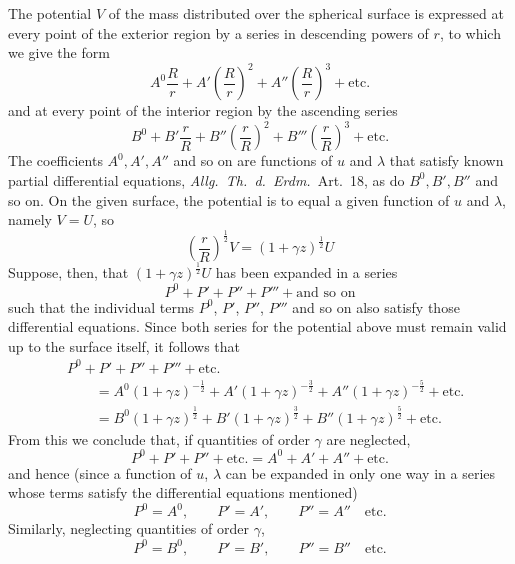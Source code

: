 The potential $V$ of the mass distributed over the spherical surface is expressed at every point of the exterior region by a series in descending powers of $r$, to which we give the form
\[
A^0\frac Rr+A'\left(\frac Rr\right)^2+A''\left(\frac Rr\right)^3+\text{etc.}
\]
and at every point of the interior region by the ascending series
\[
B^0+B'\frac rR+B''\left(\frac rR\right)^2+B'''\left(\frac rR\right)^3+\text{etc.}
\]
The coefficients $A^0,A',A''$ and so on are functions of $u$ and $\lambda$ that satisfy known partial differential equations, \textit{Allg.\ Th.\ d.\ Erdm.}\ Art.\ 18, as do $B^0,B',B''$ and so on. On the given surface, the potential is to equal a given function of $u$ and $\lambda$, namely $V=U$, so
\[
\left(\frac rR\right)^{\frac12}V=(1+\gamma z)^{\frac12}U
\]
Suppose, then, that $(1+\gamma z)^{\frac12}U$ has been expanded in a series
\[
P^0+P'+P''+P'''+\text{and so on}
\]
such that the individual terms $P^0$, $P'$, $P''$, $P'''$ and so on also satisfy those differential equations. Since both series for the potential above must remain valid up to the surface itself, it follows that
\[
\begin{aligned}
&P^0+P'+P''+P'''+\text{etc.}\\
&\qquad=A^0(1+\gamma z)^{-\frac12}+A'(1+\gamma z)^{-\frac32}+A''(1+\gamma z)^{-\frac52}+\text{etc.}\\
&\qquad=B^0(1+\gamma z)^{\frac12}+B'(1+\gamma z)^{\frac32}+B''(1+\gamma z)^{\frac52}+\text{etc.}
\end{aligned}
\]
From this we conclude that, if quantities of order $\gamma$ are neglected,
\[
P^0+P'+P''+\text{etc.}=A^0+A'+A''+\text{etc.}
\]
and hence (since a function of $u$, $\lambda$ can be expanded in only one way in a series whose terms satisfy the differential equations mentioned)
\[
P^0=A^0,\qquad P'=A',\qquad P''=A''\quad\text{etc.}
\]
Similarly, neglecting quantities of order $\gamma$,
\[
P^0=B^0,\qquad P'=B',\qquad P''=B''\quad\text{etc.}
\]

